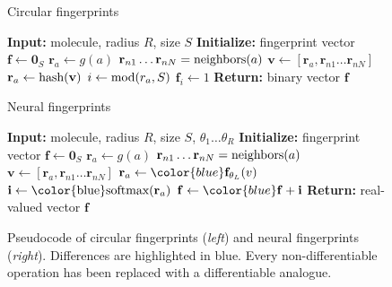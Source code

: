 \documentclass{article} %
\newcommand{\vv}{\mathbf{v}}
\newcommand{\vf}{\mathbf{f}}
\newcommand{\vi}{\mathbf{i}}
\newcommand{\vr}{\mathbf{r}}
\newcommand{\vzero}{\mathbf{0}}
\begin{document}
\begin{figure}
 \begin{minipage}[t]{0.5\columnwidth}
 \begin{algorithm}[H]
\caption{Circular fingerprints} 
\label{alg:ecfp} 
\begin{algorithmic}[1]
\State \textbf{Input:} {molecule, radius $R$, size $S$}
\State \textbf{Initialize:} {fingerprint vector $\vf \leftarrow \vzero_S$}
    \State $\vr_a \leftarrow g(a)$ 
\EndFor
{} 
		\State $\vr_{n1} \dots \vr_{nN} = \textnormal{neighbors}(a)$
		\State $\vv \leftarrow [\vr_a, \vr_{n1} \dots \vr_{nN}]$ 
		\State $\vr_a \leftarrow \textnormal{hash}(\vv)$ 
		\State $i \leftarrow \textnormal{mod}(r_a, S)$ 		
		\State $\vf_{i} \leftarrow 1$ 
	\EndFor
\EndFor
\State \textbf{Return:} {binary vector $\vf$}
\end{algorithmic}
\end{algorithm}
\end{minipage}
\hfill
\begin{minipage}[t]{0.5\columnwidth}
\begin{algorithm}[H]
\caption{Neural fingerprints} 
\label{alg:neural} 
\begin{algorithmic}[1]
\State \textbf{Input:} {molecule, radius $R$, size $S$, {\color{blue} $\theta_1 \dots \theta_R$}}
\State \textbf{Initialize:} {fingerprint vector $\vf \leftarrow \vzero_S$}
	\State $\vr_a \leftarrow g(a)$ 
\EndFor
{} 
		\State $\vr_{n1} \dots \vr_{nN} = \textnormal{neighbors}(a)$
		\State $\vv \leftarrow [\vr_a, \vr_{n1} \dots \vr_{nN}]$ 
		\State $\vr_a \leftarrow {\color{blue} \vf_{\theta_L}}(v)$ 
		\State $\vi \leftarrow \textnormal{{\color{blue}softmax}}(\vr_a)$ 
		\State $\vf \leftarrow {\color{blue} \vf + \vi}$ 
    \EndFor
\EndFor
\State \textbf{Return:} { {\color{blue} real-valued} vector $\vf$}
\end{algorithmic}
\end{algorithm}
\end{minipage}
\hfill
\caption{Pseudocode of circular fingerprints (\emph{left}) and neural fingerprints (\emph{right}).
Differences are highlighted in blue.
Every non-differentiable operation has been replaced with a differentiable analogue.}
\end{figure}
\end{document}
